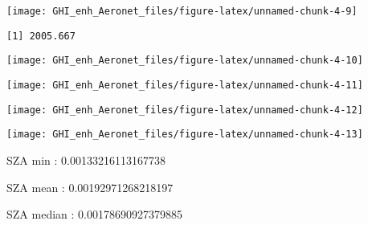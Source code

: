 \documentclass[
  10pt,
  a4paper,oneside]{article}
\begin{document}
\begin{center}\texttt{[image: GHI\_enh\_Aeronet\_files/figure-latex/unnamed-chunk-4-9]} \end{center}

\begin{verbatim}
[1] 2005.667
\end{verbatim}

\begin{center}\texttt{[image: GHI\_enh\_Aeronet\_files/figure-latex/unnamed-chunk-4-10]} \end{center}

\begin{center}\texttt{[image: GHI\_enh\_Aeronet\_files/figure-latex/unnamed-chunk-4-11]} \end{center}

\begin{center}\texttt{[image: GHI\_enh\_Aeronet\_files/figure-latex/unnamed-chunk-4-12]} \end{center}

\begin{center}\texttt{[image: GHI\_enh\_Aeronet\_files/figure-latex/unnamed-chunk-4-13]} \end{center}

SZA min : 0.00133216113167738

SZA mean : 0.00192971268218197

SZA median : 0.00178690927379885

\newpage
\end{document}
